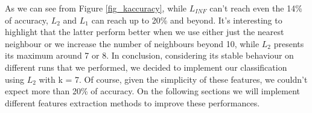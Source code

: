 As we can see from Figure \ref{fig_kaccuracy}, while $L_{INF}$ can't reach even the 14\% of accuracy, $L_2$ and $L_1$ can reach up to 20\% and beyond. It's interesting to highlight that the latter perform better when we use either just the nearest neighbour or we increase the number of neighbours beyond 10, while $L_2$ presents its maximum around 7 or 8.
In conclusion, considering its stable behaviour on different runs that we performed, we decided to implement our classification using $L_2$ with k = 7. Of course, given the simplicity of these features, we couldn't expect more than 20\% of accuracy. On the following sections we will implement different features extraction methods to improve these performances.